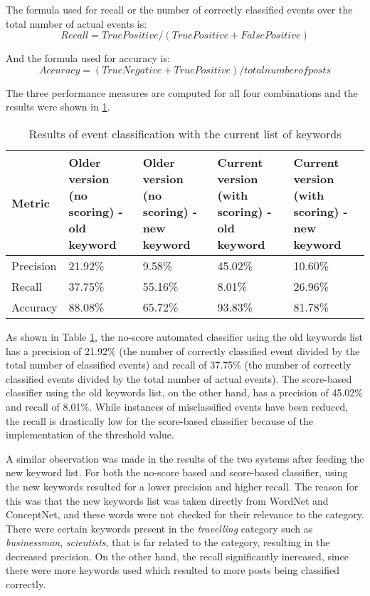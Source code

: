 The formula used for recall or the number of correctly classified events over the total number of actual events is:
\begin{equation}
Recall = True Positive / (True Positive + False Positive)
\end{equation}

And the formula used for accuracy is:
\begin{equation}
Accuracy = (True Negative + True Positive) / total number of posts
\end{equation}

The three performance measures are computed for all four combinations and the results were shown in \ref{tab:eventclassification-results}.
\clearpage

\begin{table}[ph!]   %
	\centering
	\caption{Results of event classification with the current list of keywords} \vspace{0.25em}
	\begin{tabular}{|p{1in}|p{1in}|p{1in}|p{1in}|p{1in}|} \hline
		\centering Metric & Older version (no scoring) - old keyword & Older version (no scoring) - new keyword & Current version (with scoring) - old keyword & Current version (with scoring) - new keyword \\ \hline
		Precision & 21.92\% & 9.58\% & 45.02\% & 10.60\% \\ \hline
		Recall & 37.75\% & 55.16\% & 8.01\% & 26.96\% \\ \hline
		Accuracy & 88.08\% & 65.72\%  & 93.83\% & 81.78\% \\ \hline
	\end{tabular}
	\label{tab:eventclassification-results}
\end{table}

As shown in Table \ref{tab:eventclassification-results}, the no-score automated classifier using the old keywords list has a precision of 21.92\% (the number of correctly classified event divided by the total number of classified events) and recall of 37.75\% (the number of correctly classified events divided by the total number of actual events). The score-based classifier using the old keywords list, on the other hand, has a precision of 45.02\% and recall of 8.01\%. While instances of misclassified events have been reduced, the recall is drastically low for the score-based classifier because of the implementation of the threshold value. 

A similar observation was made in the results of the two systems after feeding the new keyword list. For both the no-score based and score-based classifier, using the new keywords resulted for a lower precision and higher recall. The reason for this was that the new keywords list was taken directly from WordNet and ConceptNet, and these words were not checked for their relevance to the category. There were certain keywords present in the \textit{travelling} category such as \textit{businessman}, \textit{scientists}, that is far related to the category, resulting in the decreased precision. On the other hand, the recall significantly increased, since there were more keywords used which resulted to more posts being classified correctly.

